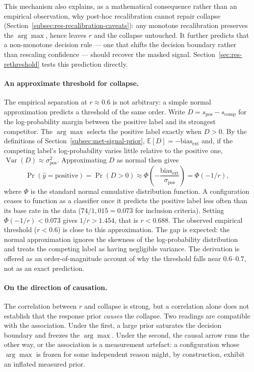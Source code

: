 This mechanism also explains, as a mathematical consequence rather than 
an empirical observation, why post-hoc recalibration cannot repair 
collapse (Section~\ref{subsec:res-recalibration-caveats}): any monotone 
recalibration preserves the $\arg\max$, hence leaves $r$ and the collapse 
untouched. It further predicts that a non-monotone decision rule --- one 
that shifts the decision boundary rather than rescaling confidence --- 
should recover the masked signal. Section~\ref{sec:res-rethreshold} tests 
this prediction directly.

\paragraph{An approximate threshold for collapse.} The empirical 
separation at $r \approx 0.6$ is not arbitrary: a simple normal 
approximation predicts a threshold of the same order. Write 
$D = s_{\text{pos}} - s_{\text{comp}}$ for the log-probability margin 
between the positive label and its strongest competitor. The $\arg\max$ 
selects the positive label exactly when $D > 0$. By the definitions of 
Section~\ref{subsec:met-signal-prior}, $\mathbb{E}[D] = -\text{bias}_{\text{ext}}$ 
and, if the competing label's log-probability varies little relative to 
the positive one, $\operatorname{Var}(D) \approx \sigma_{\text{pos}}^2$. 
Approximating $D$ as normal then gives
\[
    \Pr(\hat{y} = \text{positive}) 
    = \Pr(D > 0) 
    \approx \Phi\!\left(-\frac{\text{bias}_{\text{ext}}}{\sigma_{\text{pos}}}\right)
    = \Phi(-1/r),
\]
where $\Phi$ is the standard normal cumulative distribution function. A 
configuration ceases to function as a classifier once it predicts the 
positive label less often than its base rate in the data 
($74/1{,}015 = 0.073$ for inclusion criteria). Setting 
$\Phi(-1/r) < 0.073$ gives $1/r > 1.454$, that is $r < 0.688$. The 
observed empirical threshold ($r < 0.6$) is close to this approximation. 
The gap is expected: the normal approximation ignores the skewness of 
the log-probability distribution and treats the competing label as 
having negligible variance. The derivation is offered as an 
order-of-magnitude account of why the threshold falls near $0.6$--$0.7$, 
not as an exact prediction.

\paragraph{On the direction of causation.} The correlation between $r$ 
and collapse is strong, but a correlation alone does not establish that 
the response prior \emph{causes} the collapse. Two readings are 
compatible with the association. Under the first, a large prior 
saturates the decision boundary and freezes the $\arg\max$. Under the 
second, the causal arrow runs the other way, or the association is a 
measurement artefact: a configuration whose $\arg\max$ is frozen for some 
independent reason might, by construction, exhibit an inflated measured 
prior.

